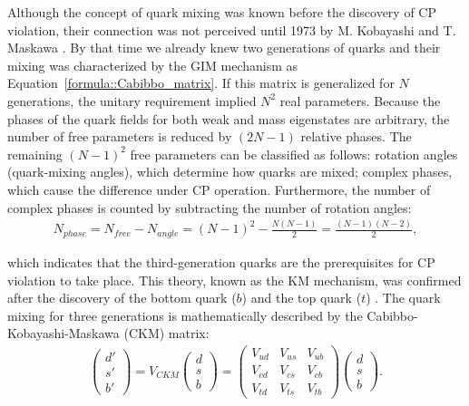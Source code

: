 
Although the concept of quark mixing was known before the discovery of CP violation, their connection was not perceived until 1973 by M. Kobayashi and T. Maskawa \parencite{KM}. By that time we already knew two generations of quarks and their mixing was characterized by the GIM mechanism as Equation~\ref{formula::Cabibbo_matrix}. If this matrix is generalized for $N$ generations, the unitary requirement implied $N^2$ real parameters. Because the phases of the quark fields for both weak and mass eigenstates are arbitrary, the number of free parameters is reduced by $(2N-1)$ relative phases. The remaining ${(N-1)^2}$ free parameters can be classified as follows: rotation angles (quark-mixing angles), which determine how quarks are mixed; complex phases, which cause the difference under CP operation. Furthermore, the number of complex phases is counted by subtracting the number of rotation angles:
%
\vspace{1em}
\begin{align*}
N_{phase} = N_{free} - N_{angle} = (N-1)^2 - \frac{N(N-1)}{2} = \frac{(N-1)(N-2)}{2},
\end{align*}

\noindent
which indicates that the third-generation quarks are the prerequisites for CP violation to take place. This theory, known as the KM mechanism, was confirmed after the discovery of the bottom quark ($b$) \parencite{bottom} and the top quark ($t$) \parencite{top_CDF, top_DO}. The quark mixing for three generations is mathematically described by the Cabibbo-Kobayashi-Maskawa (CKM) matrix:
%
\begin{align}
\begin{pmatrix}
d' \\
s' \\
b' 
\end{pmatrix}
=
V_{CKM}
\begin{pmatrix}
d \\
s \\
b
\end{pmatrix}
=
\begin{pmatrix}
V_{ud} & V_{us} & V_{ub} \\
V_{cd} & V_{cs} & V_{cb} \\
V_{td} & V_{ts} & V_{tb}
\end{pmatrix}
\begin{pmatrix}
d \\
s \\
b
\end{pmatrix}.
\label{eq:CKM}
\end{align}

